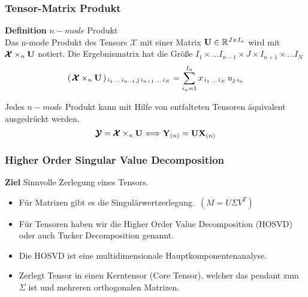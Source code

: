 \begin{frame}
\frametitle{Tensor-Matrix Produkt}
\begin{framed}

\textbf{Definition} $n-mode$ Produkt \\
Das n-mode Produkt des Tensors $\pmb{\mathcal{X}}$ mit einer Matrix $\bold{U} \in \mathbb{R}^{J \times I_n}$ wird mit $\pmb{\mathcal{X}} \times_n \bold{U}$ notiert. Die Ergebnismatrix hat die Größe $I_1 \times \dots I_{n-1} \times J \times I_{n+1} \times \dots I_N$
\begin{equation*}
	(\, \pmb{\mathcal{X}} \times_n \bold{U} \, )_{\, i_1 \, \dots \, i_{n-1} \, j \, i_{n+1}\, \dots \, i_N} = \sum_{i_n = 1}^{I_n} x_{\, i_1 \, \dots \, i_N} \, u_{j \, i_n}
\end{equation*}


\end{framed}

\pause

Jedes $n-mode$ Produkt kann mit Hilfe von entfalteten Tensoren äquivalent ausgedrückt werden.
\begin{equation*}
\pmb{\mathcal{Y}} = \pmb{\mathcal{X}} \times_n \bold{U} \Longleftrightarrow \bold{Y}_{(n)} = \bold{U} \bold{X}_{(n)}
\end{equation*}

\end{frame}

\begin{frame}
\frametitle{Higher Order Singular Value Decomposition}
\textbf{Ziel } Sinnvolle Zerlegung eines Tensors. \\

\begin{itemize}
\item Für Matrizen gibt es die Singulärwertzerlegung. $\, ( M=U \Sigma V^T ) $  
\item Für Tensoren haben wir die Higher Order Value Decomposition (HOSVD) oder auch Tucker Decomposition genannt.
\item Die HOSVD ist eine multidimensionale Hauptkomponentenanalyse.
\item Zerlegt Tensor in einen Kerntensor (Core Tensor), welcher das pendant zum $\Sigma$ ist und mehreren orthogonalen Matrizen.
\end{itemize}

\end{frame}

